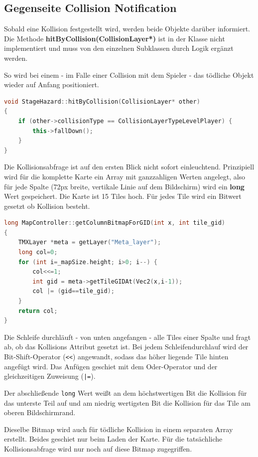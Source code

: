 \subsection{Gegenseite Collision Notification}

Sobald eine Kollision festgestellt wird, werden beide Objekte darüber informiert. Die Methode \textbf{hitByCollision(CollisionLayer*)} ist in der  Klasse nicht implementiert und muss von den einzelnen Subklassen durch Logik ergänzt werden.

So wird bei einem  - im Falle einer Collision mit dem Spieler - das tödliche Objekt wieder auf Anfang positioniert.

\begin{lstlisting}[label=lst:hit_by_collision,
				   language=C++,
				   firstnumber=32,
				   caption=Collision Notification ( StageHazard.cpp )]
void StageHazard::hitByCollision(CollisionLayer* other)
{
	if (other->collisionType == CollisionLayerTypeLevelPlayer) {
		this->fallDown();
	}
}
\end{lstlisting}



\label{sec:4_Kollisionsabfrage}

Die Kollisionsabfrage ist auf den ersten Blick nicht sofort einleuchtend. Prinzipiell wird für die komplette Karte ein Array mit ganzzahligen Werten angelegt, also für jede Spalte (72px breite, vertikale Linie auf dem Bildschirm) wird ein \textbf{long} Wert gespeichert.
Die Karte ist 15 Tiles hoch. Für jedes Tile wird ein Bitwert gesetzt ob Kollision besteht.

\begin{lstlisting}[label=lst:collision_detection,
				   language=C++,
				   firstnumber=271,
				   caption=Collision Column abfragen ( MapController.cpp )]
long MapController::getColumnBitmapForGID(int x, int tile_gid)
{
	TMXLayer *meta = getLayer("Meta_layer");
	long col=0;
	for (int i=_mapSize.height; i>0; i--) {
		col<<=1;
		int gid = meta->getTileGIDAt(Vec2(x,i-1));
		col |= (gid==tile_gid);
	}
	return col;
}
\end{lstlisting}

Die Schleife durchläuft - von unten angefangen - alle Tiles einer Spalte und fragt ab, ob das Kollisions Attribut gesetzt ist. Bei jedem Schleifendurchlauf wird der Bit-Shift-Operator (\texttt{<<}) angewandt, sodass das höher liegende Tile hinten angefügt wird. Das Anfügen geschiet mit dem Oder-Operator und der gleichzeitigen Zuweisung (\texttt{|=}).

Der abschließende \texttt{long} Wert weißt an dem höchstwertigen Bit die Kollision für das unterste Teil auf und am niedrig wertigsten Bit die Kollision für das Tile am oberen Bildschirmrand.

Dieselbe Bitmap wird auch für tödliche Kollision in einem separaten Array erstellt. Beides geschiet nur beim Laden der Karte. Für die tatsächliche Kollisionsabfrage wird nur noch auf diese Bitmap zugegriffen.
